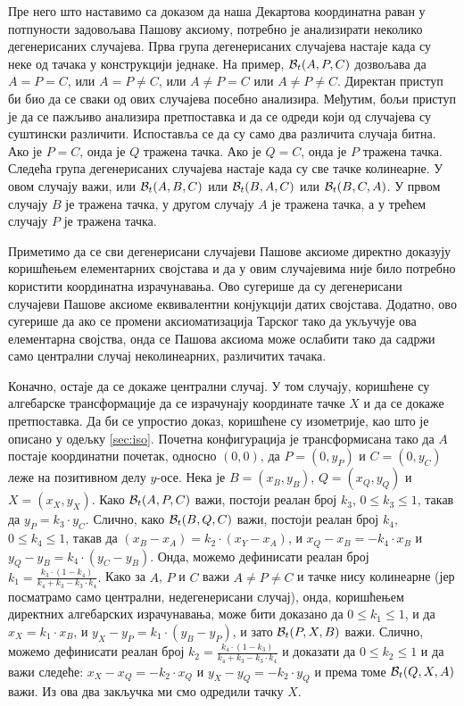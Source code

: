 Пре него што наставимо са доказом да наша Декартова координатна раван
у потпуности задовољава Пашову аксиому, потребно је анализирати
неколико дегенерисаних случајева. Прва група дегенерисаних случајева
настаје када су неке од тачака у конструкцији једнаке. На пример,
$\mathcal{B}_t(A, P, C)$ дозвољава да $A=P=C$, или $A=P\neq C$, или $A\neq
P=C$ или $A \neq P \neq C$. Директан приступ би био да се сваки од
ових случајева посебно анализира. Међутим, бољи приступ је да се
пажљиво анализира претпоставка и да се одреди који од случајева су
суштински различити. Испоставља се да су само два различита случаја
битна. Ако је $P=C$, онда је $Q$ тражена тачка. Ако је $Q=C$, онда је
$P$ тражена тачка. Следећа група дегенерисаних случајева настаје када
су све тачке колинеарне. У овом случају важи, или $\mathcal{B}_t(A, B, C)$ или
$\mathcal{B}_t(B, A, C)$ или $\mathcal{B}_t(B, C, A)$. У првом случају $B$ је тражена
тачка, у другом случају $A$ је тражена тачка, а у трећем случају $P$
је тражена тачка.

Приметимо да се сви дегенерисани случајеви Пашове аксиоме директно
доказују коришћењем елементарних својстава и да у овим случајевима
није било потребно користити координатна израчунавања. Ово сугерише да
су дегенерисани случајеви Пашове аксиоме еквивалентни конјукцији датих
својстава. Додатно, ово сугерише да ако се промени аксиоматизација
Тарског тако да укључује ова елементарна својства, онда се Пашова
аксиома може ослабити тако да садржи само централни случај
неколинеарних, различитих тачака.


Коначно, остаје да се докаже централни случај. У том случају,
коришћене су алгебарске трансформације да се израчунају координате
тачке $X$ и да се докаже претпоставка. Да би се упростио доказ,
коришћене су изометрије, као што је описано у одељку
\ref{sec:iso}. Почетна конфигурација је трансформисана тако да $A$
постаје координатни почетак, односно $(0, 0)$, да $P = (0, y_P)$ и $C
= (0, y_C)$ леже на позитивном делу $y$-осе. Нека је $B=(x_B, y_B)$,
$Q=(x_Q, y_Q)$ и $X = (x_X, y_X)$. Како $\mathcal{B}_t(A, P, C)$ важи, постоји
реалан број $k_3$, $0 \le k_3 \le 1$, такав да $y_P = k_3\cdot y_C$.
Слично, како $\mathcal{B}_t(B, Q, C)$ важи, постоји реалан број $k_4$, $0 \le
k_4 \le 1$, такав да $(x_B - x_A) = k_2 \cdot (x_Y - x_A)$, и $x_Q -
x_B = -k_4\cdot x_B$ и $y_Q - y_B = k_4\cdot (y_C - y_B)$. Онда,
можемо дефинисати реалан број $k_1 = \frac{k_3\cdot (1 - k_4)}{k_4 +
  k_3 - k_3\cdot k_4}.$ Како за $A$, $P$ и $C$ важи $A \neq P \neq C$
и тачке нису колинеарне (јер посматрамо само централни, недегенерисани
случај), онда, коришћењем директних алгебарских израчунавања, може
бити доказано да $0 \le k_1 \le 1$, и да $ x_X = k_1 \cdot x_B$, и
$y_X - y_P = k_1\cdot (y_B - y_P)$, и зато $\mathcal{B}_t(P, X, B)$
важи. Слично, можемо дефинисати реалан број $k_2 = \frac{k_4\cdot (1 -
  k_3)}{k_4 + k_3 - k_3\cdot k_4}$ и доказати да $0 \le k_2 \le 1$ и
да важи следеће: $x_X - x_Q = -k_2\cdot x_Q$ и $y_X - y_Q = - k_2\cdot
y_Q$ и према томе $\mathcal{B}_t(Q, X, A)$ важи. Из ова два закључка ми смо
одредили тачку $X$.


